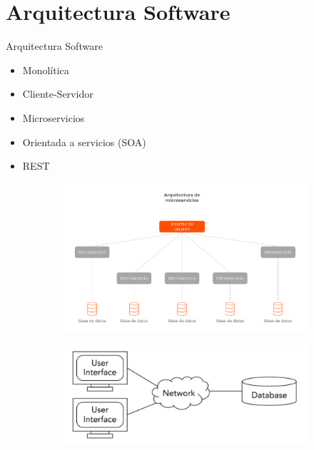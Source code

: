 \documentclass{beamer}
\begin{document}
\section{Arquitectura Software}
\begin{frame}{Arquitectura Software}
\begin{itemize}
	\item Monolítica
	\item Cliente-Servidor
	\item Microservicios
	\item Orientada a servicios (SOA)
	\item REST
\end{itemize}
\begin{figure}
	\centering
	\begin{subfigure}[t]{0.45\textwidth}
		\includegraphics[width=1.1\textwidth]{microservicios}
	\end{subfigure}
	\begin{subfigure}[b]{0.45\textwidth}
		\includegraphics[width=1.1\textwidth]{2niveles}
	\end{subfigure}
\end{figure}
\end{frame}
\end{document}
